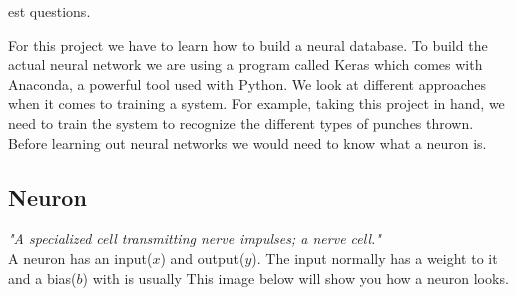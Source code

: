 \documentclass[a4paper,12pt]{report}
\begin{document}
est questions. \cite{bostrom2014ethics}

For this project we have to learn how to build a neural database. To build the actual neural network we are using a program called Keras which comes with Anaconda, a powerful tool used with Python. We look at different approaches when it comes to training a system. For example, taking this project in hand, we need to train the system to recognize the different types of punches thrown. Before learning out neural networks we would need to know what a neuron is.

\subsection{Neuron}
\textit{"A specialized cell transmitting nerve impulses; a nerve cell."} \\ A neuron has an input($x$) and output($y$). The input normally has a weight to it and a bias($b$) with is usually This image below will show you how a neuron looks.
\end{document}
